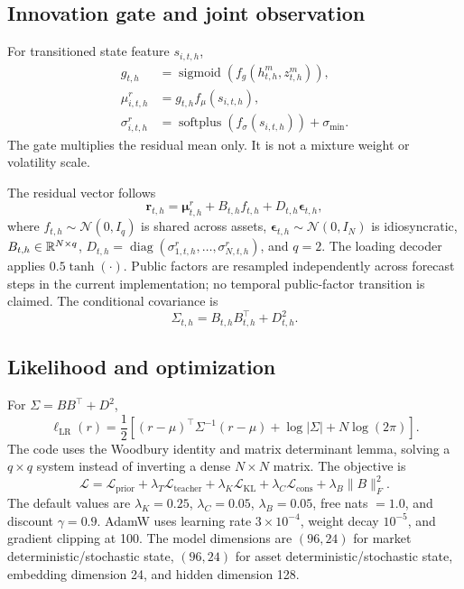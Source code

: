 \documentclass[11pt]{article}
\begin{document}
\subsection{Innovation gate and joint observation}
For transitioned state feature $s_{i,t,h}$,
\begin{align}g_{t,h}&=\operatorname{sigmoid}(f_g(h_{t,h}^m,z_{t,h}^m)),\\\mu^r_{i,t,h}&=g_{t,h}f_\mu(s_{i,t,h}),\\\sigma^r_{i,t,h}&=\operatorname{softplus}(f_\sigma(s_{i,t,h}))+\sigma_{\min}.
\end{align}
The gate multiplies the residual mean only. It is not a mixture weight or volatility scale.

The residual vector follows
\begin{equation}\mathbf r_{t,h}=\boldsymbol\mu^r_{t,h}+B_{t,h}f_{t,h}+D_{t,h}\boldsymbol\epsilon_{t,h},\end{equation}
where $f_{t,h}\sim\mathcal N(0,I_q)$ is shared across assets, $\boldsymbol\epsilon_{t,h}\sim\mathcal N(0,I_N)$ is idiosyncratic, $B_{t,h}\in\mathbb R^{N\times q}$, $D_{t,h}=\operatorname{diag}(\sigma^r_{1,t,h},\ldots,\sigma^r_{N,t,h})$, and $q=2$. The loading decoder applies $0.5\tanh(\cdot)$. Public factors are resampled independently across forecast steps in the current implementation; no temporal public-factor transition is claimed. The conditional covariance is
\begin{equation}\Sigma_{t,h}=B_{t,h}B_{t,h}^{\top}+D_{t,h}^2.
\end{equation}

\subsection{Likelihood and optimization}
For $\Sigma=BB^\top+D^2$,
\begin{equation}\ell_{\mathrm{LR}}(r)=\frac12[(r-\mu)^\top\Sigma^{-1}(r-\mu)+\log|\Sigma|+N\log(2\pi)].\end{equation}
The code uses the Woodbury identity and matrix determinant lemma, solving a $q\times q$ system instead of inverting a dense $N\times N$ matrix. The objective is
\begin{equation}\mathcal L=\mathcal L_{\mathrm{prior}}+\lambda_T\mathcal L_{\mathrm{teacher}}+\lambda_K\mathcal L_{\mathrm{KL}}+\lambda_C\mathcal L_{\mathrm{cons}}+\lambda_B\|B\|_F^2.
\end{equation}
The default values are $\lambda_K=0.25$, $\lambda_C=0.05$, $\lambda_B=0.05$, free nats $=1.0$, and discount $\gamma=0.9$. AdamW uses learning rate $3\times10^{-4}$, weight decay $10^{-5}$, and gradient clipping at 100. The model dimensions are $(96,24)$ for market deterministic/stochastic state, $(96,24)$ for asset deterministic/stochastic state, embedding dimension 24, and hidden dimension 128.
\end{document}
